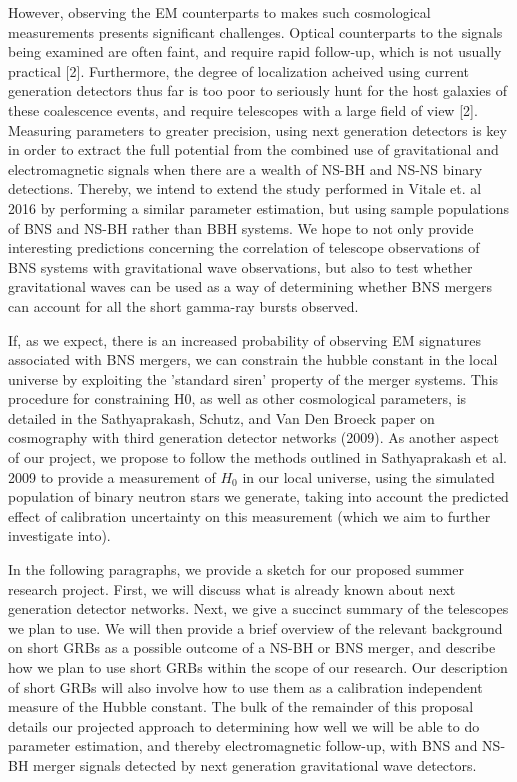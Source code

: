 \documentclass{article}
\begin{document}
However, observing the EM counterparts to makes such cosmological measurements presents significant challenges.  Optical counterparts to the signals being examined are often faint, and require rapid follow-up, which is not usually practical [2].  Furthermore, the degree of localization acheived using current generation detectors thus far is too poor to seriously hunt for the host galaxies of these coalescence events, and require telescopes with a large field of view [2].  Measuring parameters to greater precision, using next generation detectors is key in order to extract the full potential from the combined use of gravitational and electromagnetic signals when there are a wealth of NS-BH and NS-NS binary detections. Thereby, we intend to extend the study performed in Vitale et. al 2016 by performing a similar parameter estimation, but using sample populations of BNS and NS-BH rather than BBH systems.  We hope to not only provide interesting predictions concerning the correlation of telescope observations of BNS systems with gravitational wave observations, but also to test whether gravitational waves can be used as a way of determining whether BNS mergers can account for all the short gamma-ray bursts observed.

If, as we expect, there is an increased probability of observing EM signatures associated with BNS mergers, we can constrain the hubble constant in the local universe by exploiting the 'standard siren' property of the merger systems.  This procedure for constraining H0, as well as other cosmological parameters, is detailed in the Sathyaprakash, Schutz, and Van Den Broeck paper on cosmography with third generation detector networks (2009).  As another aspect of our project, we propose to follow the methods outlined in Sathyaprakash et al. 2009 to provide a measurement of $H_0$ in our local universe, using the simulated population of binary neutron stars we generate, taking into account the predicted effect of calibration uncertainty on this measurement (which we aim to further investigate into).

In the following paragraphs, we provide a sketch for our proposed summer research project.  First, we will discuss what is already known about next generation detector networks.  Next, we give a succinct summary of the telescopes we plan to use.  We will then provide a brief overview of the relevant background on short GRBs as a possible outcome of a NS-BH or BNS merger, and describe how we plan to use short GRBs within the scope of our research.  Our description of short GRBs will also involve how to use them as a calibration independent measure of the Hubble constant. The bulk of the remainder of this proposal details our projected approach to determining how well we will be able to do parameter estimation, and thereby electromagnetic follow-up, with BNS and NS-BH merger signals detected by next generation gravitational wave detectors.
\end{document}
